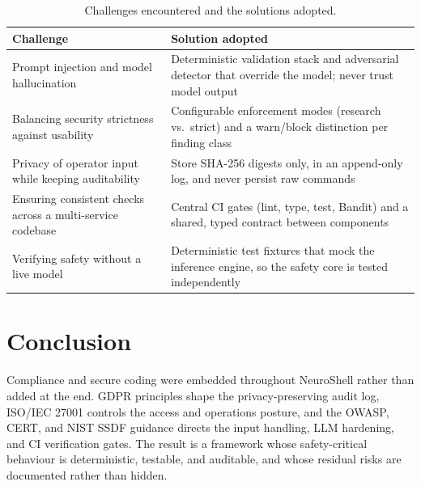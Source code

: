 \documentclass[10pt,journal,onecolumn]{IEEEtran}
\begin{document}
\begin{table}[htbp]
  \centering
  \footnotesize
  \begin{tabular}{@{}p{}p{}@{}}
    \toprule
    \textbf{Challenge} & \textbf{Solution adopted}\\
    \midrule
    Prompt injection and model hallucination & Deterministic validation stack and adversarial detector that override the model; never trust model output\\
    Balancing security strictness against usability & Configurable enforcement modes (research vs.\ strict) and a warn/block distinction per finding class\\
    Privacy of operator input while keeping auditability & Store SHA-256 digests only, in an append-only log, and never persist raw commands\\
    Ensuring consistent checks across a multi-service codebase & Central CI gates (lint, type, test, Bandit) and a shared, typed contract between components\\
    Verifying safety without a live model & Deterministic test fixtures that mock the inference engine, so the safety core is tested independently\\
    \bottomrule
  \end{tabular}
  \caption{Challenges encountered and the solutions adopted.}\label{tab:challenges}
\end{table}

\section*{Conclusion}
Compliance and secure coding were embedded throughout NeuroShell rather
than added at the end. GDPR principles shape the privacy-preserving audit
log, ISO/IEC 27001 controls the access and operations posture, and the
OWASP, CERT, and NIST SSDF guidance directs the input handling, LLM
hardening, and CI verification gates. The result is a framework whose
safety-critical behaviour is deterministic, testable, and auditable, and
whose residual risks are documented rather than hidden.
\end{document}
